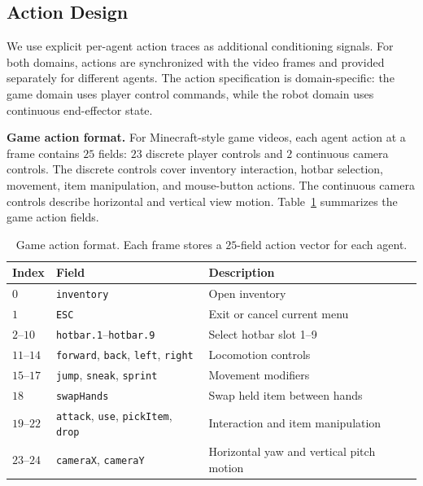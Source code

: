 \subsection{Action Design}
\label{app:action-design}

We use explicit per-agent action traces as additional conditioning signals.
For both domains, actions are synchronized with the video frames and provided separately for different agents.
The action specification is domain-specific: the game domain uses player control commands, while the robot domain uses continuous end-effector state.

\noindent\textbf{Game action format.}
For Minecraft-style game videos, each agent action at a frame contains $25$ fields: $23$ discrete player controls and $2$ continuous camera controls.
The discrete controls cover inventory interaction, hotbar selection, movement, item manipulation, and mouse-button actions.
The continuous camera controls describe horizontal and vertical view motion.
Table~\ref{tab:game-action-format} summarizes the game action fields.

\begin{table}[t]
  \centering
  \footnotesize
  \caption{Game action format. Each frame stores a $25$-field action vector for each agent.}
  \label{tab:game-action-format}
  \vspace{4pt}
  \setlength{\tabcolsep}{4pt}
  \renewcommand{\arraystretch}{1.12}
  \begin{tabular}{@{}lll@{}}
    \toprule
    \textbf{Index} & \textbf{Field} & \textbf{Description} \\
    \midrule
    $0$ & \texttt{inventory} & Open inventory \\
    $1$ & \texttt{ESC} & Exit or cancel current menu \\
    $2$--$10$ & \texttt{hotbar.1}--\texttt{hotbar.9} & Select hotbar slot 1--9 \\
    $11$--$14$ & \texttt{forward}, \texttt{back}, \texttt{left}, \texttt{right} & Locomotion controls \\
    $15$--$17$ & \texttt{jump}, \texttt{sneak}, \texttt{sprint} & Movement modifiers \\
    $18$ & \texttt{swapHands} & Swap held item between hands \\
    $19$--$22$ & \texttt{attack}, \texttt{use}, \texttt{pickItem}, \texttt{drop} & Interaction and item manipulation \\
    $23$--$24$ & \texttt{cameraX}, \texttt{cameraY} & Horizontal yaw and vertical pitch motion \\
    \bottomrule
  \end{tabular}
\end{table}

